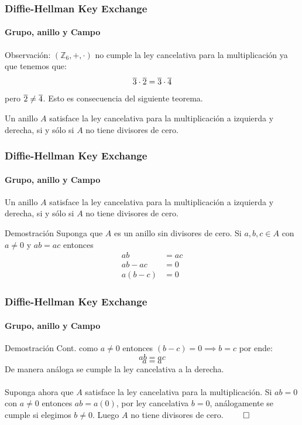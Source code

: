 \documentclass[spanish, mexico]{beamer}
\begin{document}
	\begin{frame}
	    \frametitle{Diffie-Hellman Key Exchange}
		\framesubtitle{Grupo, anillo y Campo}
	    Observación: $(\mathbb{Z}_6, +, \cdot)$ no cumple la ley cancelativa para la multiplicación ya que tenemos que:
	    $$\overline{\rm 3} \cdot \overline{\rm 2} = \overline{\rm 3} \cdot \overline{\rm 4}$$
	    pero $\overline{\rm 2} \neq \overline{\rm 4}$. Esto es consecuencia del siguiente teorema.
	    \begin{theorem}
	        Un anillo $A$ satisface la ley cancelativa para la multiplicación a izquierda y derecha, si y sólo si $A$ no tiene divisores de cero.
	    \end{theorem}
	\end{frame}
	
	\begin{frame}
	    \frametitle{Diffie-Hellman Key Exchange}
		\framesubtitle{Grupo, anillo y Campo}
	    \begin{theorem}[A]
	        Un anillo $A$ satisface la ley cancelativa para la multiplicación a izquierda y derecha, si y sólo si $A$ no tiene divisores de cero.
	    \end{theorem}
	    \begin{block}{Demostración}
	        Suponga que $A$ es  un anillo sin divisores de cero. Si  $a,b,c \in A$ con $a \neq 0$ y $ab = ac$ entonces
	        \begin{align*}
	            ab &= ac\\
	            ab - ac &=0\\
	            a(b-c) &=0
	        \end{align*}
	    \end{block}
	\end{frame}
	
	\begin{frame}
	    \frametitle{Diffie-Hellman Key Exchange}
		\framesubtitle{Grupo, anillo y Campo}
	    \begin{block}{Demostración Cont.}
	        como $a \neq 0$ entonces $(b-c) = 0 \implies b = c$ por ende:
	        $$ab = ac$$
	        $$a = a$$
	        De manera análoga se cumple la ley cancelativa a la derecha.\\~\\
	        Suponga ahora que $A$ satisface la ley cancelativa para la multiplicación. Si $ab = 0$ con $a \neq 0$ entonces $ab = a(0)$, por ley cancelativa $b=0$, análogamente se cumple si elegimos $b\neq0$. Luego $A$ no tiene divisores de cero. $\qed$
	    \end{block}
	\end{frame}
	
\end{document}

